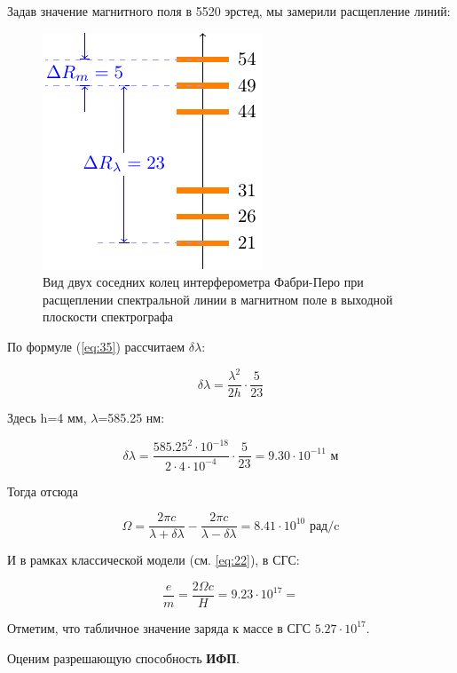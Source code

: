 Задав значение магнитного поля в 5520 эрстед, мы замерили расщепление линий:

\begin{figure}[H]
	\centering
	\includegraphics[scale=1]{ris/2b}
	\caption{Вид двух соседних колец интерферометра Фабри-Перо при расщеплении спектральной линии в магнитном поле в выходной плоскости спектрографа}
	\label{fig:ris2b}
\end{figure}

По формуле (\ref{eq:35}) рассчитаем $\delta\lambda$:

\begin{equation}
 	\delta \lambda=\frac{\lambda^2}{2h}\cdot\frac{5}{23}
 \end{equation} 

Здесь h=4 мм,  $\lambda$=585.25 нм:

\begin{equation}
 	\delta \lambda=\frac{585.25^2\cdot10^{-18}}{2\cdot4\cdot10^{-4}}\cdot\frac{5}{23}=9.30\cdot10^{-11} \text{ м}
 \end{equation} 

Тогда отсюда

\begin{equation}
	\Omega=\frac{2\pi c}{\lambda+\delta \lambda}-\frac{2\pi c}{\lambda-\delta \lambda}=8.41\cdot10^{10} \text{ рад/c}
\end{equation}

И в рамках классической модели (см. \ref{eq:22}), в СГС:

\begin{equation}
	\frac{e}{m}=\frac{2\Omega c}{H}=9.23\cdot10^{17}=
\end{equation}

Отметим, что табличное значение заряда к массе в СГС $5.27\cdot10^{17}$.

Оценим разрешающую способность \textbf{ИФП}. 

